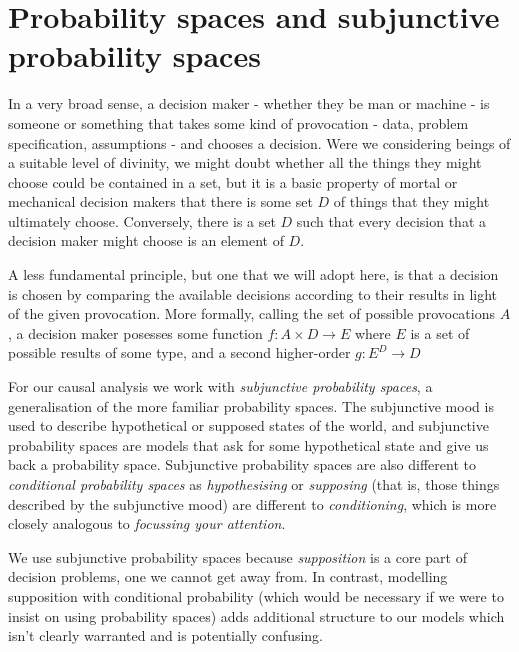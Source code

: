


\section{Probability spaces and subjunctive probability spaces}

In a very broad sense, a decision maker - whether they be man or machine - is someone or something that takes some kind of provocation - data, problem specification, assumptions - and chooses a decision. Were we considering beings of a suitable level of divinity, we might doubt whether all the things they might choose could be contained in a set, but it is a basic property of mortal or mechanical decision makers that there is some set $D$ of things that they might ultimately choose. Conversely, there is a set $D$ such that every decision that a decision maker might choose is an element of $D$.

A less fundamental principle, but one that we will adopt here, is that a decision is chosen by comparing the available decisions according to their results in light of the given provocation. More formally, calling the set of possible provocations $A$, a decision maker posesses some function $f:A\times D\to E$ where $E$ is a set of possible results of some type, and a second higher-order $g:E^D\to D$ 

For our causal analysis we work with \emph{subjunctive probability spaces}, a generalisation of the more familiar probability spaces. The subjunctive mood is used to describe hypothetical or supposed states of the world, and subjunctive probability spaces are models that ask for some hypothetical state and give us back a probability space. Subjunctive probability spaces are also different to \emph{conditional probability spaces} \citet{renyi_conditional_1956} as \emph{hypothesising} or \emph{supposing} (that is, those things described by the subjunctive mood) are different to \emph{conditioning}, which is more closely analogous to \emph{focussing your attention}.

We use subjunctive probability spaces because \emph{supposition} is a core part of decision problems, one we cannot get away from. In contrast, modelling supposition with conditional probability (which would be necessary if we were to insist on using probability spaces) adds additional structure to our models which isn't clearly warranted and is potentially confusing.

